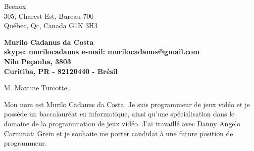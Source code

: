 \documentclass[11pt]{letter} %
\begin{document}

\begin{letter}{%
Beenox \\
305, Charest Est, Bureau 700 \\
Québec, Qc, Canada G1K 3H3} 


\begin{center}
\large\bf Murilo Cadanus da Costa \\ %
skype: murilocadanus e-mail: murilocadanus@gmail.com \\
Nilo Peçanha, 3803 \\ Curitiba, PR - 82120440 - Brésil
\end{center} 
\vfill

\signature{Murilo C. da Costa} %


\opening{M. Maxime Turcotte,} 


Mon nom est Murilo Cadanus da Costa. Je suis programmeur de jeux vidéo et je possède un baccalauréat en informatique, ainsi qu'une spécialisation dans le domaine de la programmation de jeux vidéo. J'ai travaillé avec Danny Angelo Carminati Grein et je souhaite me porter candidat à une future position de programmeur.


\end{letter}
\end{document}
